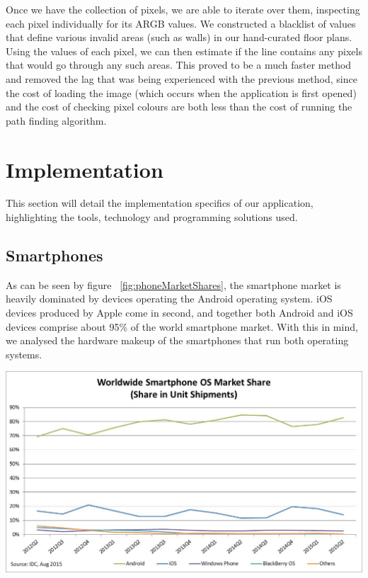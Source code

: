 \documentclass[12pt,a4paper]{report}
\begin{document}
Once we have the collection of pixels, we are able to iterate over them, inspecting each pixel individually for its ARGB values. We constructed a blacklist of values that define various invalid areas (such as walls) in our hand-curated floor plans. Using the values of each pixel, we can then estimate if the line contains any pixels that would go through any such areas.
This proved to be a much faster method and removed the lag that was being experienced with the previous method, since the cost of loading the image (which occurs when the application is first opened) and the cost of checking pixel colours are both less than the cost of running the path finding algorithm.

\chapter{Implementation}
This section will detail the implementation specifics of our application, highlighting the tools, technology and programming solutions used.

\section{Smartphones}

As can be seen by figure ~\ref{fig:phoneMarketShares}, the smartphone market is heavily dominated by devices operating the Android operating system. iOS devices produced by Apple come in second, and together both Android and iOS devices comprise about 95\% of the world smartphone market. With this in mind, we analysed the hardware makeup of the smartphones that run both operating systems. \\

\begin{center}
\includegraphics[scale=0.7]{images/phoneMarketShare.png}
\label{fig:phoneMarketShares}
\end{center}
\end{document}
